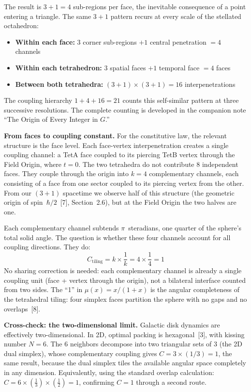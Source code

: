 \documentclass[11pt]{article}
\begin{document}
\noindent
The result is $3 + 1 = 4$ sub-regions per face, the inevitable consequence of a point entering a triangle.
The same $3 + 1$ pattern recurs at every scale of the stellated octahedron:
%
\begin{itemize}[nosep,leftmargin=2em]
\item \textbf{Within each face:} $3$ corner sub-regions $+ 1$ central penetration $= 4$ channels
\item \textbf{Within each tetrahedron:} $3$ spatial faces $+ 1$ temporal face $= 4$ faces
\item \textbf{Between both tetrahedra:} $(3+1) \times (3+1) = 16$ interpenetrations
\end{itemize}
%
The coupling hierarchy $1 + 4 + 16 = 21$ counts this self-similar pattern at three successive resolutions.
The complete counting is developed in the companion note ``The Origin of Every Integer in $G$.''

\textbf{From faces to coupling constant.}\quad
For the constitutive law, the relevant structure is the face level.
Each face-vertex interpenetration creates a single coupling channel: a TetA face coupled to its piercing TetB vertex through the Field Origin, where $t = 0$.
The two tetrahedra do not contribute 8 independent faces.
They couple through the origin into $k = 4$ complementary channels, each consisting of a face from one sector coupled to its piercing vertex from the other.
From our $(3+1)$ spacetime we observe half of this structure (the geometric origin of spin~$\hbar/2$~[7], Section~2.6), but at the Field Origin the two halves are one.

Each complementary channel subtends $\pi$~steradians, one quarter of the sphere's total solid angle.
The question is whether these four channels account for all coupling directions.
They do:
\begin{equation}
C_{\text{tiling}} = k \times \frac{1}{k} = 4 \times \frac{1}{4} = 1
\label{eq:c-equals-1}
\end{equation}
No sharing correction is needed: each complementary channel is already a single coupling unit (face + vertex through the origin), not a bilateral interface counted from two sides.
The ``1'' in $\mu(x) = x/(1+x)$ is the angular completeness of the tetrahedral tiling: four simplex faces partition the sphere with no gaps and no overlaps~[8].

\textbf{Cross-check: the two-dimensional limit.}\quad
Galactic disk dynamics are effectively two-dimensional.
In 2D, optimal packing is hexagonal~[3], with kissing number $N = 6$.
The 6 neighbors decompose into two triangular sets of 3 (the 2D dual simplex), whose complementary coupling gives $C = 3 \times (1/3) = 1$, the same result, because the dual simplex tiles the available angular space completely in any dimension.
Equivalently, using the standard overlap calculation: $C = 6 \times (\frac{1}{3}) \times (\frac{1}{2}) = 1$, confirming $C = 1$ through a second route.
\end{document}
